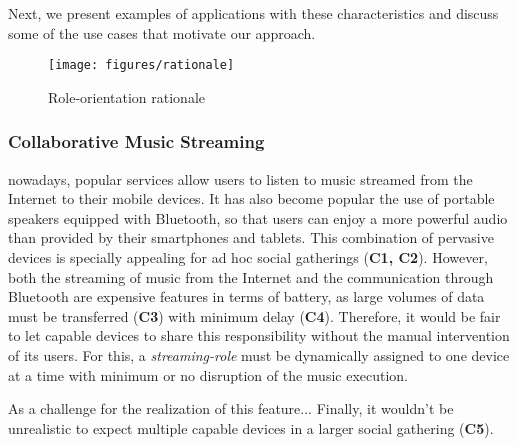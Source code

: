 \begin{enumerate}[label=C\arabic*]
	
\end{enumerate}


Next, we present examples of applications with these characteristics and discuss some of the use cases that motivate our approach.

\begin{figure*}[t!]
	\centering
	\texttt{[image: figures/rationale]}
	\caption{Role-orientation rationale}
	\label{fig:rationale}
\end{figure*}

\subsubsection{Collaborative Music Streaming}

nowadays, popular services allow users to listen to music streamed from the Internet to their mobile devices. It has also become popular the use of portable speakers equipped with Bluetooth, so that users can enjoy a more powerful audio than provided by their smartphones and tablets. This combination of pervasive devices is specially appealing for ad hoc social gatherings (\textbf{C1, C2}). However, both the streaming of music from the Internet and the communication through Bluetooth are expensive features in terms of battery, as large volumes of data must be transferred (\textbf{C3}) with minimum delay (\textbf{C4}). Therefore, it would be fair to let capable devices to share this responsibility without the manual intervention of its users. For this, a \textit{streaming-role} must be dynamically assigned to one device at a time with minimum or no disruption of the music execution. 

As a challenge for the realization of this feature... Finally, it wouldn't be unrealistic to expect multiple capable devices in a larger social gathering  (\textbf{C5}).




